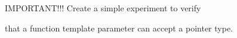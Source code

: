 IMPORTANT!!! Create a simple experiment to verify

that a function template parameter can accept a pointer type.

